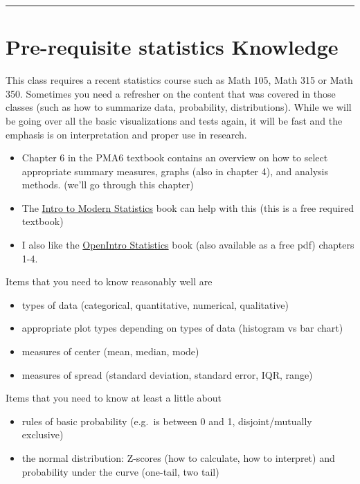 \documentclass[
  letterpaper,
  DIV=11,
  numbers=noendperiod]{scrartcl}
\providecommand{\tightlist}{%
  \setlength{\itemsep}{0pt}\setlength{\parskip}{0pt}}\usepackage{longtable,booktabs,array}
\begin{document}
\begin{center}\rule{0.5\linewidth}{0.5pt}\end{center}

\hypertarget{pre-requisite-statistics-knowledge}{%
\section{Pre-requisite statistics
Knowledge}\label{pre-requisite-statistics-knowledge}}

This class requires a recent statistics course such as Math 105, Math
315 or Math 350. Sometimes you need a refresher on the content that was
covered in those classes (such as how to summarize data, probability,
distributions). While we will be going over all the basic visualizations
and tests again, it will be fast and the emphasis is on interpretation
and proper use in research.

\begin{itemize}
\tightlist
\item
  Chapter 6 in the PMA6 textbook contains an overview on how to select
  appropriate summary measures, graphs (also in chapter 4), and analysis
  methods. (we'll go through this chapter)
\item
  The \href{https://openintro-ims.netlify.app/}{Intro to Modern
  Statistics} book can help with this (this is a free required textbook)
\item
  I also like the \href{https://leanpub.com/os}{OpenIntro Statistics}
  book (also available as a free pdf) chapters 1-4.
\end{itemize}

Items that you need to know reasonably well are

\begin{itemize}
\tightlist
\item
  types of data (categorical, quantitative, numerical, qualitative)
\item
  appropriate plot types depending on types of data (histogram vs bar
  chart)
\item
  measures of center (mean, median, mode)
\item
  measures of spread (standard deviation, standard error, IQR, range)
\end{itemize}

Items that you need to know at least a little about

\begin{itemize}
\tightlist
\item
  rules of basic probability (e.g.~is between 0 and 1, disjoint/mutually
  exclusive)
\item
  the normal distribution: Z-scores (how to calculate, how to interpret)
  and probability under the curve (one-tail, two tail)
\end{itemize}
\end{document}
